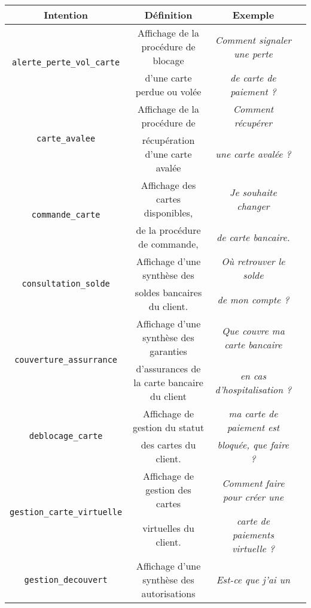 		\begin{table}[!htb]
			\begin{center}
			\begin{scriptsize}
			\begin{tabular}{|c|c|c|c|}
			
				\hline
				\textbf{Intention}
					& \textbf{Définition}
					& \textbf{Exemple}
					\tabularnewline
					\hline
				\multirow{2}{*}{\texttt{alerte\_perte\_vol\_carte}}
					& Affichage de la procédure de blocage
					& \textit{Comment signaler une perte}
					\tabularnewline
					& d'une carte perdue ou volée
					& \textit{de carte de paiement ?}
					\tabularnewline
					\hline
				\multirow{2}{*}{\texttt{carte\_avalee}}
					& Affichage de la procédure de
					& \textit{Comment récupérer}
					\tabularnewline
					& récupération d'une carte avalée
					& \textit{une carte avalée ?}
					\tabularnewline
					\hline
				\multirow{2}{*}{\texttt{commande\_carte}}
					& Affichage des cartes disponibles,
					& \textit{Je souhaite changer}
					\tabularnewline
					& de la procédure de commande,
					& \textit{de carte bancaire.}
					\tabularnewline
					\hline
				\multirow{2}{*}{\texttt{consultation\_solde}}
					& Affichage d'une synthèse des
					& \textit{Où retrouver le solde}
					\tabularnewline
					& soldes bancaires du client.
					& \textit{ de mon compte ?}
					\tabularnewline
					\hline
				\multirow{2}{*}{\texttt{couverture\_assurrance}}
					& Affichage d'une synthèse des garanties
					& \textit{Que couvre ma carte bancaire}
					\tabularnewline
					& d'assurances de la carte bancaire du client
					& \textit{en cas d'hospitalisation ?}
					\tabularnewline
					\hline
				\multirow{2}{*}{\texttt{deblocage\_carte}}
					& Affichage de gestion du statut
					& \textit{ma carte de paiement est}
					\tabularnewline
					& des cartes du client.
					& \textit{bloquée, que faire ?}
					\tabularnewline
					\hline
				\multirow{2}{*}{\texttt{gestion\_carte\_virtuelle}}
					& Affichage de gestion des cartes
					& \textit{Comment faire pour créer une}
					\tabularnewline
					& virtuelles du client.
					& \textit{carte de paiements virtuelle ?}
					\tabularnewline
					\hline
				\multirow{2}{*}{\texttt{gestion\_decouvert}}
					& Affichage d'une synthèse des autorisations
					& \textit{Est-ce que j'ai un}
					\tabularnewline

\end{tabular}
\end{scriptsize}
\end{center}
\end{table}
